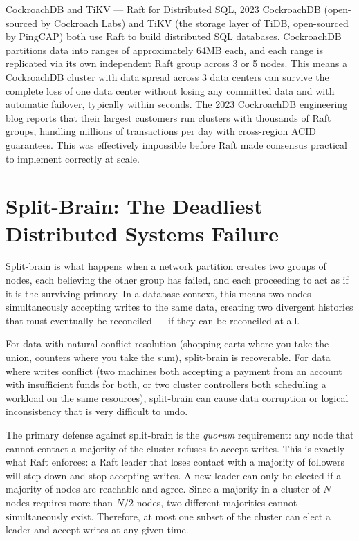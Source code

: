 \documentclass[11pt,a4paper]{article}
\begin{document}
\begin{industrybox}{CockroachDB and TiKV --- Raft for Distributed SQL, 2023}
CockroachDB (open-sourced by Cockroach Labs) and TiKV (the storage layer of TiDB, open-sourced by PingCAP) both use Raft to build distributed SQL databases. CockroachDB partitions data into ranges of approximately 64MB each, and each range is replicated via its own independent Raft group across 3 or 5 nodes. This means a CockroachDB cluster with data spread across 3 data centers can survive the complete loss of one data center without losing any committed data and with automatic failover, typically within seconds. The 2023 CockroachDB engineering blog reports that their largest customers run clusters with thousands of Raft groups, handling millions of transactions per day with cross-region ACID guarantees. This was effectively impossible before Raft made consensus practical to implement correctly at scale.
\end{industrybox}

\section{Split-Brain: The Deadliest Distributed Systems Failure}

Split-brain is what happens when a network partition creates two groups of nodes, each believing the other group has failed, and each proceeding to act as if it is the surviving primary. In a database context, this means two nodes simultaneously accepting writes to the same data, creating two divergent histories that must eventually be reconciled --- if they can be reconciled at all.

For data with natural conflict resolution (shopping carts where you take the union, counters where you take the sum), split-brain is recoverable. For data where writes conflict (two machines both accepting a payment from an account with insufficient funds for both, or two cluster controllers both scheduling a workload on the same resources), split-brain can cause data corruption or logical inconsistency that is very difficult to undo.

The primary defense against split-brain is the \textit{quorum} requirement: any node that cannot contact a majority of the cluster refuses to accept writes. This is exactly what Raft enforces: a Raft leader that loses contact with a majority of followers will step down and stop accepting writes. A new leader can only be elected if a majority of nodes are reachable and agree. Since a majority in a cluster of $N$ nodes requires more than $N/2$ nodes, two different majorities cannot simultaneously exist. Therefore, at most one subset of the cluster can elect a leader and accept writes at any given time.
\end{document}
